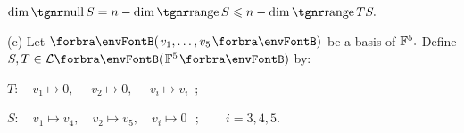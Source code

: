 \Or $\dim\null S=n-\dim\range S\leqslant n-\dim\range TS.$\par\quad\Hb
{}\PfEnd\vspace{8pt}\quad
(c) Let $\Par{v_1,\dots,v_5}$ be a basis of ${\mathbb{F}}^5.$ Define $S,T\in\Lm{\Fbb^5}$ by:\par\quad\Hc
\hspace{60pt}$T:\quad v_1\mapsto 0,\quad\,\, v_2\mapsto 0,\,\,\quad v_i\mapsto v_i\,\,\,;$\par\quad\Hc
\hspace{60pt}$S:\quad v_1\mapsto v_4,\quad v_2\mapsto v_5,\quad v_i\mapsto 0\,\,\,\,;\qquad i=3,4,5.$\PfEnd
\SepLine

